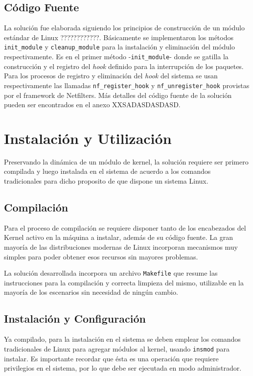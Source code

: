 \subsection{Código Fuente}
La solución fue elaborada siguiendo los principios de construcción de un módulo estándar de Linux ????????????. Básicamente se implementaron los métodos \verb=init_module= y \verb=cleanup_module= para la instalación y eliminación del módulo respectivamente. Es en el primer método -\verb=init_module=- donde se gatilla la construcción y el registro del \emph{hook} definido para la interrupción de los paquetes. Para los procesos de registro y eliminación del \emph{hook} del sistema se usan respectivamente las llamadas \verb=nf_register_hook= y \verb=nf_unregister_hook= provistas por el framework de Netfilters. Más detalles del código fuente de la solución pueden ser encontrados en el anexo XXSADASDASDASD.


\section{Instalación y Utilización}
Preservando la dinámica de un módulo de kernel, la solución requiere ser primero compilada y luego instalada en el sistema de acuerdo a los comandos tradicionales para dicho proposito de que dispone un sistema Linux.

\subsection{Compilación}
Para el proceso de compilación se requiere disponer tanto de los encabezados del Kernel activo en la máquina a instalar, además de su código fuente. La gran mayoría de las distribuciones modernas de Linux incorporan mecanismos muy simples para poder obtener esos recursos sin mayores problemas.

La solución desarrollada incorpora un archivo \verb=Makefile= que resume las instrucciones para la compilación y correcta limpieza del mismo, utilizable en la mayoría de los escenarios sin necesidad de ningún cambio.

\subsection{Instalación y Configuración}
Ya compilado, para la instalación en el sistema se deben emplear los comandos tradicionales de Linux para agregar módulos al kernel, usando \verb=insmod= para instalar. Es importante recordar que ésta es una operación que requiere privilegios en el sistema, por lo que debe ser ejecutada en modo administrador.

